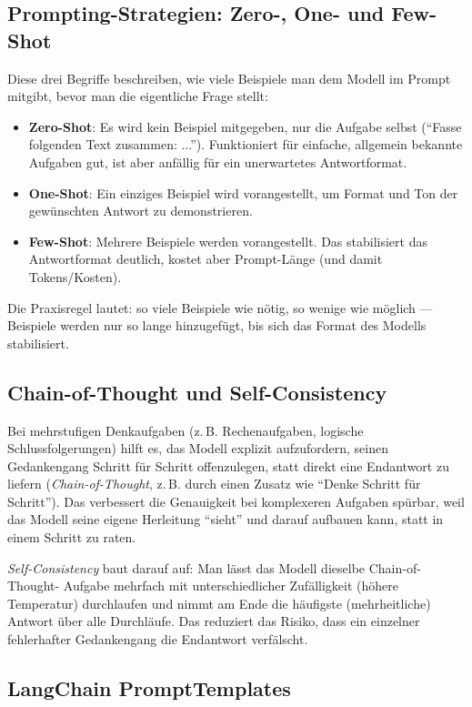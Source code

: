\subsection{Prompting-Strategien: Zero-, One- und Few-Shot}

Diese drei Begriffe beschreiben, wie viele Beispiele man dem Modell im Prompt mitgibt,
bevor man die eigentliche Frage stellt:
\begin{itemize}
    \item \textbf{Zero-Shot}: Es wird kein Beispiel mitgegeben, nur die Aufgabe selbst
          (\enquote{Fasse folgenden Text zusammen: ...}). Funktioniert für einfache, allgemein
          bekannte Aufgaben gut, ist aber anfällig für ein unerwartetes Antwortformat.
    \item \textbf{One-Shot}: Ein einziges Beispiel wird vorangestellt, um Format und Ton
          der gewünschten Antwort zu demonstrieren.
    \item \textbf{Few-Shot}: Mehrere Beispiele werden vorangestellt. Das stabilisiert das
          Antwortformat deutlich, kostet aber Prompt-Länge (und damit Tokens/Kosten).
\end{itemize}
Die Praxisregel lautet: so viele Beispiele wie nötig, so wenige wie möglich --- Beispiele
werden nur so lange hinzugefügt, bis sich das Format des Modells stabilisiert.

\subsection{Chain-of-Thought und Self-Consistency}

Bei mehrstufigen Denkaufgaben (z.\,B. Rechenaufgaben, logische Schlussfolgerungen) hilft
es, das Modell explizit aufzufordern, seinen Gedankengang Schritt für Schritt
offenzulegen, statt direkt eine Endantwort zu liefern (\emph{Chain-of-Thought},
z.\,B. durch einen Zusatz wie \enquote{Denke Schritt für Schritt}). Das verbessert die
Genauigkeit bei komplexeren Aufgaben spürbar, weil das Modell seine eigene Herleitung
\enquote{sieht} und darauf aufbauen kann, statt in einem Schritt zu raten.

\emph{Self-Consistency} baut darauf auf: Man lässt das Modell dieselbe Chain-of-Thought-
Aufgabe mehrfach mit unterschiedlicher Zufälligkeit (höhere Temperatur) durchlaufen und
nimmt am Ende die häufigste (mehrheitliche) Antwort über alle Durchläufe. Das reduziert
das Risiko, dass ein einzelner fehlerhafter Gedankengang die Endantwort verfälscht.

\subsection{LangChain PromptTemplates}

